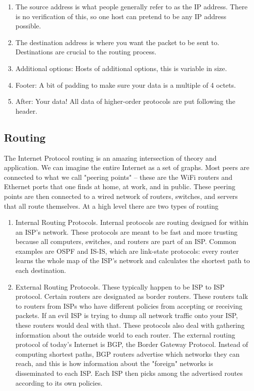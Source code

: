 \begin{enumerate}
  \item The source address is what people generally refer to as the IP address.
    There is no verification of this, so one host can pretend to be any IP address possible.
  \item The destination address is where you want the packet to be sent to.
    Destinations are crucial to the routing process.
  \item Additional options: Hosts of additional options, this is variable in size.
  \item Footer: A bit of padding to make sure your data is a multiple of 4 octets.
  \item After: Your data! All data of higher-order protocols are put following the header.
\end{enumerate}

\subsection{Routing}

The Internet Protocol routing is an amazing intersection of theory and application.
We can imagine the entire Internet as a set of graphs.
Most peers are connected to what we call "peering points" -- these are the WiFi routers and Ethernet ports that one finds at home, at work, and in public.
These peering points are then connected to a wired network of routers, switches, and servers that all route themselves.
At a high level there are two types of routing

\begin{enumerate}
\item Internal Routing Protocols.
  Internal protocols are routing designed for within an ISP's network.
  These protocols are meant to be fast and more trusting because all computers, switches, and routers are part of an ISP.
  Common examples are OSPF and IS-IS, which are link-state protocols: every router learns the whole map of the ISP's network and calculates the shortest path to each destination.
\item External Routing Protocols.
  These typically happen to be ISP to ISP protocol.
  Certain routers are designated as border routers.
  These routers talk to routers from ISPs who have different policies from accepting or receiving packets.
  If an evil ISP is trying to dump all network traffic onto your ISP, these routers would deal with that.
  These protocols also deal with gathering information about the outside world to each router.
  The external routing protocol of today's Internet is BGP, the Border Gateway Protocol.
  Instead of computing shortest paths, BGP routers advertise which networks they can reach, and this is how information about the "foreign" networks is disseminated to each ISP.
  Each ISP then picks among the advertised routes according to its own policies.
\end{enumerate}

